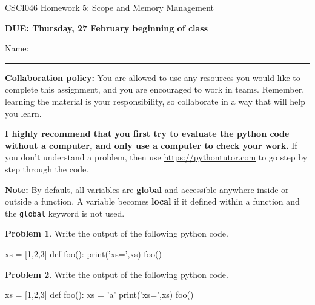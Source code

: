 \documentclass[12pt]{article}
\theoremstyle{definition}
\newtheorem{problem}{Problem}
\begin{document}
\begin{center}
    {
\Large
CSCI046 Homework 5: Scope and Memory Management
}


    \vspace{0.1in}
    \textbf{DUE: Thursday, 27 February beginning of class}

    \vspace{0.1in}
\end{center}

\vspace{0.25in}
\noindent
Name: 

\noindent
\rule{\textwidth}{0.1pt}
\vspace{0.15in}

\noindent
\textbf{Collaboration policy:} 
You are allowed to use any resources you would like to complete this assignment,
and you are encouraged to work in teams.
Remember, learning the material is your responsibility,
so collaborate in a way that will help you learn.

\textbf{I highly recommend that you first try to evaluate the python code without a computer, and only use a computer to check your work.
}
If you don't understand a problem, then use \url{https://pythontutor.com} to go step by step through the code.
\vspace{0.15in}

\noindent
\textbf{Note:}
By default, all variables are \textbf{global} and accessible anywhere inside or outside a function.
A variable becomes \textbf{local} if it defined within a function and the \texttt{global} keyword is not used.

\begin{problem}
Write the output of the following python code.
\begin{python}
xs = [1,2,3]
def foo():
    print('xs=',xs)
foo()
\end{python}
\end{problem}
\vspace{1in}

\begin{problem}
Write the output of the following python code.
\begin{python}
xs = [1,2,3]
def foo():
    xs = 'a'
    print('xs=',xs)
foo()
\end{python}
\end{problem}
\vspace{1in}
\end{document}

